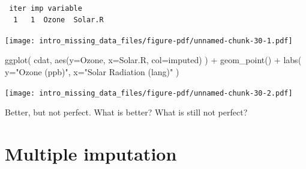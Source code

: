 \documentclass[
  letterpaper,
  DIV=11,
  numbers=noendperiod]{scrreprt}
\newenvironment{Shaded}{}{}
\newcommand{\AttributeTok}[1]{\textcolor[rgb]{0.49,0.56,0.16}{#1}}
\newcommand{\DecValTok}[1]{\textcolor[rgb]{0.25,0.63,0.44}{#1}}
\newcommand{\FunctionTok}[1]{\textcolor[rgb]{0.02,0.16,0.49}{#1}}
\newcommand{\NormalTok}[1]{#1}
\newcommand{\OtherTok}[1]{\textcolor[rgb]{0.00,0.44,0.13}{#1}}
\newcommand{\SpecialCharTok}[1]{\textcolor[rgb]{0.25,0.44,0.63}{#1}}
\newcommand{\StringTok}[1]{\textcolor[rgb]{0.25,0.44,0.63}{#1}}
\begin{document}
\begin{verbatim}

 iter imp variable
  1   1  Ozone  Solar.R
\end{verbatim}

\begin{Shaded}
\end{Shaded}

\begin{center}
\texttt{[image: intro\_missing\_data\_files/figure-pdf/unnamed-chunk-30-1.pdf]}
\end{center}

\begin{Shaded}
\begin{Highlighting}[]
  \FunctionTok{ggplot}\NormalTok{( cdat, }\FunctionTok{aes}\NormalTok{(}\AttributeTok{y=}\NormalTok{Ozone, }\AttributeTok{x=}\NormalTok{Solar.R, }\AttributeTok{col=}\NormalTok{imputed) ) }\SpecialCharTok{+}
    \FunctionTok{geom\_point}\NormalTok{() }\SpecialCharTok{+}
    \FunctionTok{labs}\NormalTok{( }\AttributeTok{y=}\StringTok{"Ozone (ppb)"}\NormalTok{, }\AttributeTok{x=}\StringTok{"Solar Radiation (lang)"}\NormalTok{ )}
\end{Highlighting}
\end{Shaded}

\begin{center}
\texttt{[image: intro\_missing\_data\_files/figure-pdf/unnamed-chunk-30-2.pdf]}
\end{center}

Better, but not perfect. What is better? What is still not perfect?

\section{Multiple imputation}\label{multiple-imputation}
\end{document}
